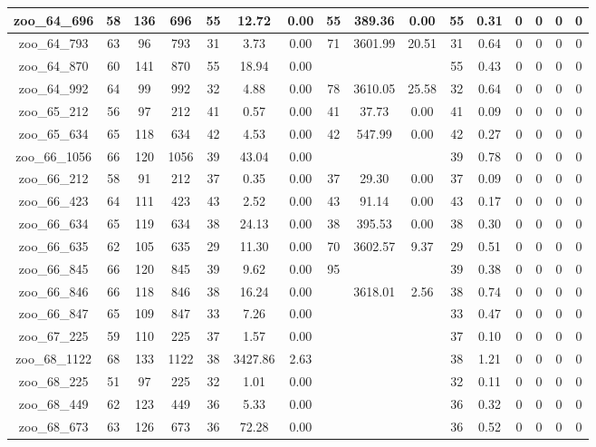 \begin{landscape}
\begin{longtable}{|c|c|c|c|c|c|c|c|c|c|c|c|c|c|c|c|}
zoo\_64\_696 & 58 & 136 & 696 & 55 & 12.72 & 0.00 & 55 & 389.36 & 0.00 & 55 & 0.31 & 0 & 0 & 0 & 0 \\ \hline 
zoo\_64\_793 & 63 & 96 & 793 & 31 & 3.73 & 0.00 & 71 & 3601.99 & 20.51 & 31 & 0.64 & 0 & 0 & 0 & 0 \\ \hline 
zoo\_64\_870 & 60 & 141 & 870 & 55 & 18.94 & 0.00 &  &  &  & 55 & 0.43 & 0 & 0 & 0 & 0 \\ \hline 
zoo\_64\_992 & 64 & 99 & 992 & 32 & 4.88 & 0.00 & 78 & 3610.05 & 25.58 & 32 & 0.64 & 0 & 0 & 0 & 0 \\ \hline 
zoo\_65\_212 & 56 & 97 & 212 & 41 & 0.57 & 0.00 & 41 & 37.73 & 0.00 & 41 & 0.09 & 0 & 0 & 0 & 0 \\ \hline 
zoo\_65\_634 & 65 & 118 & 634 & 42 & 4.53 & 0.00 & 42 & 547.99 & 0.00 & 42 & 0.27 & 0 & 0 & 0 & 0 \\ \hline 
zoo\_66\_1056 & 66 & 120 & 1056 & 39 & 43.04 & 0.00 &  &  &  & 39 & 0.78 & 0 & 0 & 0 & 0 \\ \hline 
zoo\_66\_212 & 58 & 91 & 212 & 37 & 0.35 & 0.00 & 37 & 29.30 & 0.00 & 37 & 0.09 & 0 & 0 & 0 & 0 \\ \hline 
zoo\_66\_423 & 64 & 111 & 423 & 43 & 2.52 & 0.00 & 43 & 91.14 & 0.00 & 43 & 0.17 & 0 & 0 & 0 & 0 \\ \hline 
zoo\_66\_634 & 65 & 119 & 634 & 38 & 24.13 & 0.00 & 38 & 395.53 & 0.00 & 38 & 0.30 & 0 & 0 & 0 & 0 \\ \hline 
zoo\_66\_635 & 62 & 105 & 635 & 29 & 11.30 & 0.00 & 70 & 3602.57 & 9.37 & 29 & 0.51 & 0 & 0 & 0 & 0 \\ \hline 
zoo\_66\_845 & 66 & 120 & 845 & 39 & 9.62 & 0.00 & 95 &  &  & 39 & 0.38 & 0 & 0 & 0 & 0 \\ \hline 
zoo\_66\_846 & 66 & 118 & 846 & 38 & 16.24 & 0.00 &  & 3618.01 & 2.56 & 38 & 0.74 & 0 & 0 & 0 & 0 \\ \hline 
zoo\_66\_847 & 65 & 109 & 847 & 33 & 7.26 & 0.00 &  &  &  & 33 & 0.47 & 0 & 0 & 0 & 0 \\ \hline 
zoo\_67\_225 & 59 & 110 & 225 & 37 & 1.57 & 0.00 &  &  &  & 37 & 0.10 & 0 & 0 & 0 & 0 \\ \hline 
zoo\_68\_1122 & 68 & 133 & 1122 & 38 & 3427.86 & 2.63 &  &  &  & 38 & 1.21 & 0 & 0 & 0 & 0 \\ \hline 
zoo\_68\_225 & 51 & 97 & 225 & 32 & 1.01 & 0.00 &  &  &  & 32 & 0.11 & 0 & 0 & 0 & 0 \\ \hline 
zoo\_68\_449 & 62 & 123 & 449 & 36 & 5.33 & 0.00 &  &  &  & 36 & 0.32 & 0 & 0 & 0 & 0 \\ \hline 
zoo\_68\_673 & 63 & 126 & 673 & 36 & 72.28 & 0.00 &  &  &  & 36 & 0.52 & 0 & 0 & 0 & 0 \\ \hline 

\end{longtable}
\end{landscape}
